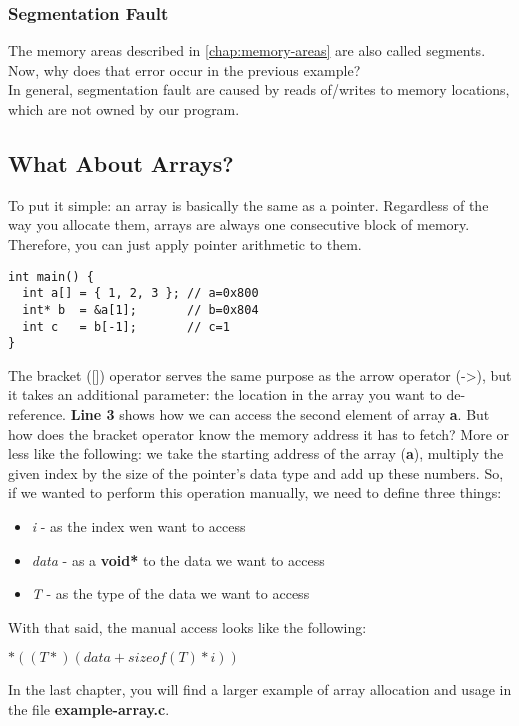 \documentclass{article}
\begin{document}
  \subsubsection{Segmentation Fault}
  The memory areas described in \autoref{chap:memory-areas} are also called segments.
  Now, why does that error occur in the previous example?
  \\In general, segmentation fault are caused by reads of/writes to memory locations, which are not owned by our program.
  
  
  \subsection{What About Arrays?}
  To put it simple: an array is basically the same as a pointer.
  Regardless of the way you allocate them, arrays are always one consecutive block of memory.
  Therefore, you can just apply pointer arithmetic to them.
  \begin{lstlisting}
int main() {
  int a[] = { 1, 2, 3 }; // a=0x800
  int* b  = &a[1];       // b=0x804
  int c   = b[-1];       // c=1
}
  \end{lstlisting}
  The bracket ([]) operator serves the same purpose as the arrow operator (->), but it takes an additional parameter: the location in the array you want to de-reference.
  \textbf{Line 3} shows how we can access the second element of array \textbf{a}.
  But how does the bracket operator know the memory address it has to fetch?
  More or less like the following: we take the starting address of the array (\textbf{a}), multiply the given index by the size of the pointer's data type and add up these numbers.
  So, if we wanted to perform this operation manually, we need to define three things:
  \begin{itemize}
    \item \textit{i} - as the index wen want to access
    \item \textit{data} - as a \textbf{void*} to the data we want to access
    \item \textit{T} - as the type of the data we want to access
  \end{itemize}
  With that said, the manual access looks like the following:
  \begin{center}
    $*((\textit{T}*)(\textit{data} + sizeof(\textit{T}) * \textit{i}))$
  \end{center}
  In the last chapter, you will find a larger example of array allocation and usage in the file \textbf{example-array.c}.
  
\end{document}
